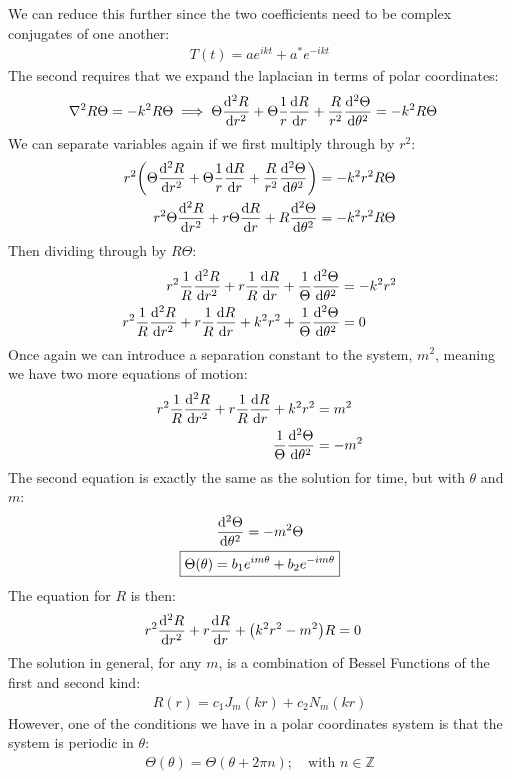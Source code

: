 \documentclass[12pt]{article}
\begin{document}
We can reduce this further since the two coefficients need to be complex conjugates of one another:
\begin{align*}
  T(t)=ae^{ikt}+a^*e^{-ikt}
\end{align*}
The second requires that we expand the laplacian in terms of polar coordinates:
\begin{align*}
  \laplacian{R\Theta}&=-k^2R\Theta\implies
  \Theta\dv[2]{R}{r}+\Theta\frac1r\dv{R}{r}+
  \frac{R}{r^2}\dv[2]{\Theta}{\theta}=-k^2R\Theta
\end{align*}
We can separate variables again if we first multiply through by $r^2$:
\begin{align*}
  r^2\qty(\Theta\dv[2]{R}{r}+\Theta\frac1r\dv{R}{r}+
  \frac{R}{r^2}\dv[2]{\Theta}{\theta})&=-k^2r^2R\Theta\\
  r^2\Theta\dv[2]{R}{r}+r\Theta\dv{R}{r}+
  R\dv[2]{\Theta}{\theta}&=-k^2r^2R\Theta
\end{align*}
Then dividing through by $R\Theta$:
\begin{align*}
  r^2\frac1R\dv[2]{R}{r}+r\frac1R\dv{R}{r}+
  \frac1\Theta\dv[2]{\Theta}{\theta}&=-k^2r^2\\
  r^2\frac1R\dv[2]{R}{r}+r\frac1R\dv{R}{r}+k^2r^2
  +\frac1\Theta\dv[2]{\Theta}{\theta}&=0
\end{align*}
Once again we can introduce a separation constant to the system, $m^2$, meaning we have two more equations of motion:
\begin{align*}
  r^2\frac1R\dv[2]{R}{r}+r\frac1R\dv{R}{r}+k^2r^2&=m^2\\
  \frac1\Theta\dv[2]{\Theta}{\theta}&=-m^2
\end{align*}
The second equation is exactly the same as the solution for time, but with $\theta$ and $m$:
\begin{gather*}
  \dv[2]{\Theta}{\theta}=-m^2\Theta\\
  \boxed{\Theta(\theta)=b_1e^{im\theta}+b_2e^{-im\theta}}
\end{gather*}
The equation for $R$ is then:
\begin{align*}
  r^2\dv[2]{R}{r}+r\dv{R}{r}+\qty(k^2r^2-m^2)R&=0
\end{align*}
The solution in general, for any $m$, is a combination of Bessel Functions of the first and second kind:
\begin{align*}
  R(r)=c_1J_m(kr)+c_2N_m(kr)
\end{align*}
However, one of the conditions we have in a polar coordinates system is that the system is periodic in $\theta$:
\begin{align*}
  \Theta(\theta)=\Theta(\theta+2\pi n);\quad \text{with } n\in\mathbb{Z}
\end{align*}
\end{document}
